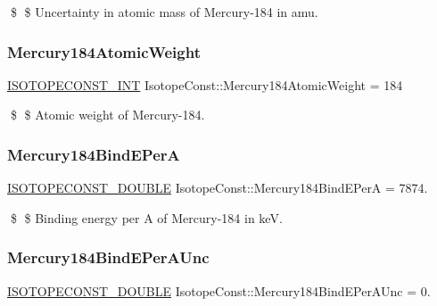\$ \$ Uncertainty in atomic mass of Mercury-\/184 in amu. \mbox{\label{group___isotope_const-_mercury-_hg184_ga0e2c49741f742ae0bdb5a12f170e2838}} 
\subsubsection{\texorpdfstring{Mercury184\+Atomic\+Weight}{Mercury184AtomicWeight}}
{\footnotesize\ttfamily \mbox{\hyperlink{group___isotope_const-_macros_ga5f18360b3e99483a35c32d789e62621c}{I\+S\+O\+T\+O\+P\+E\+C\+O\+N\+S\+T\+\_\+\+I\+NT}} Isotope\+Const\+::\+Mercury184\+Atomic\+Weight = 184}

\$ \$ Atomic weight of Mercury-\/184. \mbox{\label{group___isotope_const-_mercury-_hg184_ga19d001fbed688f29ca347830547522c0}} 
\subsubsection{\texorpdfstring{Mercury184\+Bind\+E\+PerA}{Mercury184BindEPerA}}
{\footnotesize\ttfamily \mbox{\hyperlink{group___isotope_const-_macros_ga8f45a7272ce02c0b4c65c44636ed719a}{I\+S\+O\+T\+O\+P\+E\+C\+O\+N\+S\+T\+\_\+\+D\+O\+U\+B\+LE}} Isotope\+Const\+::\+Mercury184\+Bind\+E\+PerA = 7874.}

\$ \$ Binding energy per A of Mercury-\/184 in keV. \mbox{\label{group___isotope_const-_mercury-_hg184_gaf8319b2fa178d786331d8aec2eafc477}} 
\subsubsection{\texorpdfstring{Mercury184\+Bind\+E\+Per\+A\+Unc}{Mercury184BindEPerAUnc}}
{\footnotesize\ttfamily \mbox{\hyperlink{group___isotope_const-_macros_ga8f45a7272ce02c0b4c65c44636ed719a}{I\+S\+O\+T\+O\+P\+E\+C\+O\+N\+S\+T\+\_\+\+D\+O\+U\+B\+LE}} Isotope\+Const\+::\+Mercury184\+Bind\+E\+Per\+A\+Unc = 0.}

